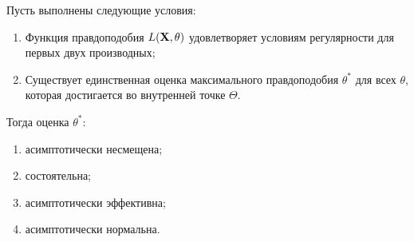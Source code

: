 \begin{thm*}
    Пусть выполнены следующие условия:
    \begin{enumerate}
        \item Функция правдоподобия $L(\mathbf{X}, \theta)$ удовлетворяет условиям регулярности для первых двух производных;
        \item Существует единственная оценка максимального правдоподобия $\theta^{*}$ для всех $\theta$, которая достигается во внутренней точке $\Theta$.
    \end{enumerate}
    Тогда оценка $\theta^{*}$:
    \begin{enumerate}
        \item асимптотически несмещена;
        \item состоятельна;
        \item асимптотически эффективна;
        \item асимптотически нормальна.
    \end{enumerate}
\end{thm*}